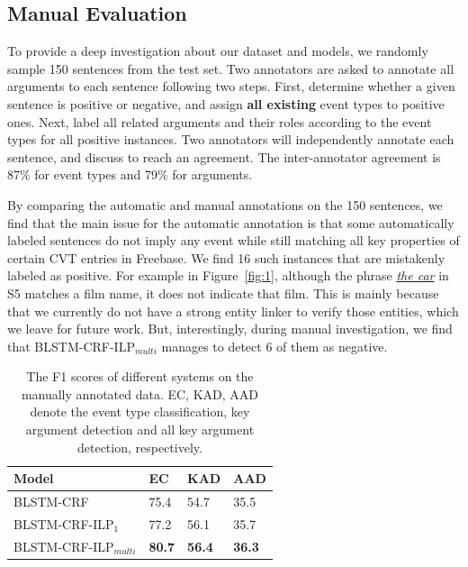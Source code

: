 \subsection{Manual Evaluation}\label{manualeve}
To provide a deep investigation about our dataset and models, we randomly sample 150 sentences
from the test set. Two annotators are asked to annotate all arguments to each sentence following
two steps. First, determine whether a given sentence is positive or negative, and assign \textbf{all existing}
event types to positive ones. Next, label all related arguments and their roles according to
the event types for all positive instances. Two annotators will independently annotate each sentence,
and discuss to reach an agreement. The inter-annotator agreement is 87\% for event types and 79\% for arguments.


By comparing the automatic and manual annotations on the 150 sentences, we find that
the main issue for the automatic annotation is that some automatically labeled sentences
do not imply any event while still matching all key properties of certain CVT entries in Freebase.
We find 16 such instances that are mistakenly labeled as positive.
For example in Figure~\ref{fig:1}, although the phrase \underline{\emph{the car}} in S5 matches a film name,
it does not indicate that film. %
This is mainly because that we currently do not have a strong entity linker to verify those entities, which we leave for
future work.
But, interestingly,
during manual investigation,
we find that BLSTM-CRF-ILP$_{multi}$ manages to detect 6 of them as negative.


\begin{table}[h]
\small
\centering
\begin{tabular}{|l|p{0.8cm}<{\centering}|p{0.8cm}<{\centering}|p{0.8cm}<{\centering}|} \hline
	Model & EC & KAD & AAD \\ \hline
	BLSTM-CRF & 75.4 & 54.7 & 35.5 \\ \hline
	BLSTM-CRF-ILP$_{1}$ & 77.2 & 56.1 & 35.7 \\ \hline
	BLSTM-CRF-ILP$_{multi}$ & \textbf{80.7} & \textbf{56.4} & \textbf{36.3} \\ \hline
\end{tabular}
\caption{The F1 scores of different systems on the manually annotated data. EC, KAD, AAD denote the event type classification, key argument detection and all key argument detection, respectively. \label{tab:2}}
\end{table}

